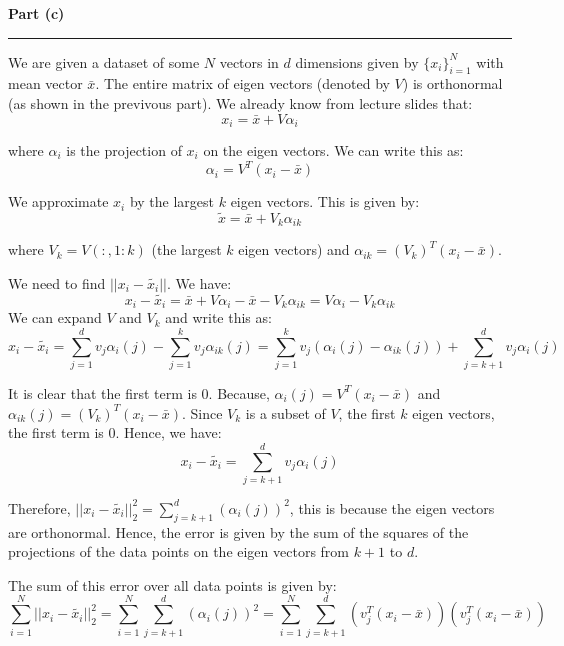 \documentclass[a4paper,12pt]{article}
\newenvironment{solution}[2][]{%
    \begin{mdframed}[linecolor=blue!70!black, linewidth=2pt, roundcorner=10pt, backgroundcolor=yellow!10!white, skipabove=12pt, skipbelow=12pt]%
        \textbf{\large #2}
        \par\noindent\rule{\textwidth}{0.4pt}
}{
    \end{mdframed}
}
\begin{document}
\begin{solution}{Part (c)}
We are given a dataset of some $N$ vectors in $d$ dimensions given by $\{x_i\}_{i=1}^N$ with mean vector $\bar{x}$. The entire matrix of eigen vectors (denoted by $V$) is orthonormal (as shown in the previvous part). We already know from lecture slides that:
\begin{equation}
  x_i = \bar{x} + V\alpha_i
\end{equation}

where $\alpha_i$ is the projection of $x_i$ on the eigen vectors. We can write this as:
\begin{equation}
  \alpha_i = V^T(x_i - \bar{x})
\end{equation}

We approximate $x_i$ by the largest $k$ eigen vectors. This is given by:
\begin{equation}
  \tilde{x} = \bar{x} + V_k\alpha_{ik}
\end{equation}

where $V_k = V(:,1:k)$ (the largest $k$ eigen vectors) and $\alpha_{ik} = (V_k)^T(x_i - \bar{x})$.


We need to find $||x_i-\tilde{x_i}||$. We have:
\begin{equation}
  x_i - \tilde{x_i} = \bar{x} + V\alpha_i - \bar{x} - V_k\alpha_{ik} = V\alpha_i - V_k\alpha_{ik}
\end{equation}
We can expand $V$ and $V_k$ and write this as:
\begin{equation}
  x_i - \tilde{x_i} = \sum_{j=1}^{d} v_j\alpha_i(j) - \sum_{j=1}^{k} v_j\alpha_{ik}(j) = \sum_{j=1}^k v_j(\alpha_i(j) - \alpha_{ik}(j)) + \sum_{j=k+1}^d v_j\alpha_i(j)
\end{equation}

It is clear that the first term is 0. Because, $\alpha_i(j) = V^T(x_i - \bar{x})$ and $\alpha_{ik}(j) = (V_k)^T(x_i - \bar{x})$. Since $V_k$ is a subset of $V$, the first $k$ eigen vectors, the first term is 0. Hence, we have:
\begin{equation}
  x_i - \tilde{x_i} = \sum_{j=k+1}^d v_j\alpha_i(j)
\end{equation}

Therefore, $||x_i-\tilde{x_i}||_2^2 = \sum_{j=k+1}^{d} (\alpha_i(j))^2$, this is because the eigen vectors are orthonormal. Hence, the error is given by the sum of the squares of the projections of the data points on the eigen vectors from $k+1$ to $d$.


The sum of this error over all data points is given by:
\begin{equation}
  \sum_{i=1}^{N} ||x_i-\tilde{x_i}||_2^2 = \sum_{i=1}^{N} \sum_{j=k+1}^{d} (\alpha_i(j))^2 = \sum_{i=1}^{N} \sum_{j=k+1}^{d} (v_j^T(x_i - \bar{x}))(v_j^T(x_i - \bar{x}))
\end{equation}


\end{solution}
\end{document}
